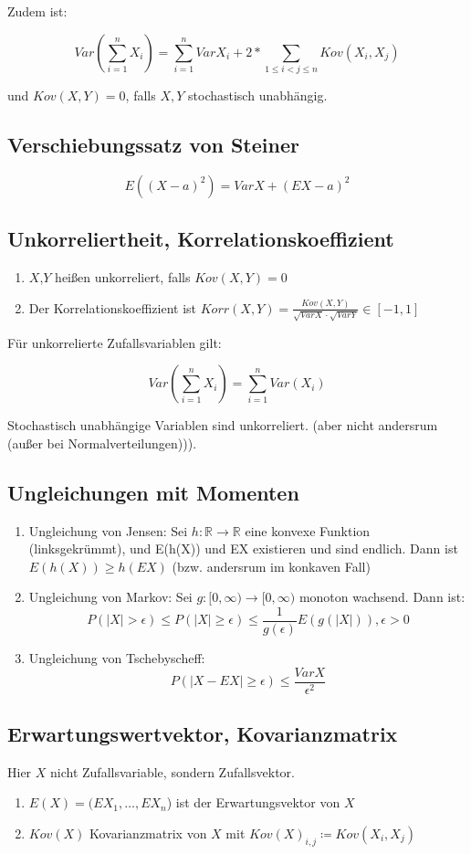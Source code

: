 \documentclass{scrartcl}%
\begin{document}
Zudem ist:

\[Var(\sum\limits_{i=1}^n X_i) = \sum\limits_{i=1}^n Var X_i + 2* \sum\limits_{1\leq i < j \leq n} Kov(X_i,X_j)\]

und $Kov(X,Y) = 0$, falls $X,Y$ stochastisch unabhängig.
\subsection{Verschiebungssatz von Steiner}
\[E((X-a)^2) = Var X + (EX-a)^2\]

\subsection{Unkorreliertheit, Korrelationskoeffizient}
\begin{enumerate}
	\item{$X$,$Y$ heißen unkorreliert, falls $Kov(X,Y) = 0$}
	\item{Der Korrelationskoeffizient ist $Korr(X,Y) = \frac{Kov(X,Y)}{\sqrt{Var X} \cdot \sqrt{Var Y}} \in [-1,1]$}
\end{enumerate}
Für unkorrelierte Zufallsvariablen gilt:

\[Var (\sum\limits_{i=1}^n X_i) = \sum\limits_{i=1}^n Var(X_i)\]

Stochastisch unabhängige Variablen sind unkorreliert. (aber nicht andersrum (außer bei Normalverteilungen))).

\subsection{Ungleichungen mit Momenten}
\begin{enumerate}
	\item{Ungleichung von Jensen: Sei $h:\mathbb{R} \rightarrow \mathbb{R}$ eine konvexe Funktion (linksgekrümmt), und E(h(X)) und EX existieren und sind endlich. Dann ist $E(h(X)) \geq h(EX)$ (bzw. andersrum im konkaven Fall)}
	\item{Ungleichung von Markov: Sei $g:[0,\infty) \rightarrow [0,\infty)$ monoton wachsend. Dann ist: 
		\[P(\vert X\vert > \epsilon) \leq P(\vert X\vert \geq \epsilon) \leq \frac{1}{g(\epsilon)} E(g(\vert X\vert)), \epsilon > 0\]}
	\item{Ungleichung von Tschebyscheff: \[P(\vert X-EX\vert \geq \epsilon) \leq \frac{Var X}{\epsilon^2}\]}
\end{enumerate}

\subsection{Erwartungswertvektor, Kovarianzmatrix}
Hier $X$ nicht Zufallsvariable, sondern Zufallsvektor.
\begin{enumerate}
	\item{$E(X) = (EX_1, \ldots, EX_n$) ist der Erwartungsvektor von $X$}
	\item{$Kov (X)$ Kovarianzmatrix von $X$ mit $Kov(X)_{i,j} \coloneqq Kov(X_i,X_j)$}
\end{enumerate}
\end{document}
